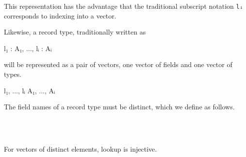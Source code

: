 This representation has the advantage that the traditional subscript
notation \texttt{lᵢ} corresponds to indexing into a vector.

Likewise, a record type, traditionally written as

\begin{myDisplay}
{ l₁ : A₁, ..., lᵢ : Aᵢ }
\end{myDisplay}

will be represented as a pair of vectors, one vector of fields and one
vector of types.

\begin{myDisplay}
l₁, ..., lᵢ
A₁, ..., Aᵢ
\end{myDisplay}

The field names of a record type must be distinct, which we define as
follows.

\begin{fence}
\begin{code}%
\>[0]\AgdaSpace{}%
\AgdaSymbol{:}\AgdaSpace{}%
\AgdaSpace{}%
\AgdaSymbol{:}\AgdaSpace{}%
\AgdaSymbol{\}\{}\AgdaSymbol{\}}\AgdaSpace{}%
\AgdaSpace{}%
\AgdaSpace{}%
\AgdaSpace{}%
\AgdaSpace{}%
\AgdaSpace{}%
\<%
\\
\>[0]\AgdaSpace{}%
\AgdaInductiveConstructor{[]}\AgdaSpace{}%
\AgdaSymbol{=}\AgdaSpace{}%
\<%
\\
\>[0]\AgdaSpace{}%
\AgdaSymbol{(}\AgdaSpace{}%
\AgdaSpace{}%
\AgdaSymbol{)}\AgdaSpace{}%
\AgdaSymbol{=}\AgdaSpace{}%
\AgdaSpace{}%
\AgdaSymbol{(}\AgdaSpace{}%
\AgdaSpace{}%
\AgdaSymbol{)}\AgdaSpace{}%
\AgdaSpace{}%
\AgdaSpace{}%
\<%
\end{code}
\end{fence}

For vectors of distinct elements, lookup is injective.

